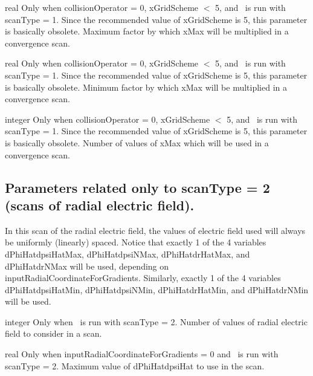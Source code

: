 \myhrule

{real}
{Only when {\ttfamily collisionOperator} = 0, {\ttfamily xGridScheme} $<$ 5, and \sfincsScan~is run with {\ttfamily scanType} = 1.
Since the recommended value of {\ttfamily xGridScheme} is 5, this parameter is basically obsolete.}
{Maximum factor by which {\ttfamily xMax} will be multiplied in a convergence scan.}

\myhrule

{real}
{Only when {\ttfamily collisionOperator} = 0, {\ttfamily xGridScheme} $<$ 5, and \sfincsScan~is run with {\ttfamily scanType} = 1.
Since the recommended value of {\ttfamily xGridScheme} is 5, this parameter is basically obsolete.}
{Minimum factor by which {\ttfamily xMax} will be multiplied in a convergence scan.}

\myhrule

{integer}
{Only when {\ttfamily collisionOperator} = 0, {\ttfamily xGridScheme} $<$ 5, and \sfincsScan~is run with {\ttfamily scanType} = 1.
Since the recommended value of {\ttfamily xGridScheme} is 5, this parameter is basically obsolete.}
{Number of values of {\ttfamily xMax} which will be used in a convergence scan.}




\subsection{Parameters related only to {\ttfamily scanType} = 2 (scans of radial electric field).}

In this scan of the radial electric field, the values of electric field used
will always be uniformly (linearly) spaced.  
Notice that exactly 1 of the 4 variables {\ttfamily dPhiHatdpsiHatMax}, {\ttfamily dPhiHatdpsiNMax}, {\ttfamily dPhiHatdrHatMax}, and {\ttfamily dPhiHatdrNMax}
will be used, depending on\\
{\ttfamily inputRadialCoordinateForGradients}.
Similarly, exactly 1 of the 4 variables
{\ttfamily dPhiHatdpsiHatMin}, {\ttfamily dPhiHatdpsiNMin}, {\ttfamily dPhiHatdrHatMin}, and {\ttfamily dPhiHatdrNMin}
will be used.

\myhrule

{integer}
{Only when \sfincsScan~is run with {\ttfamily scanType} = 2.}
{Number of values of radial electric field to consider in a scan.}

\myhrule

{real}
{Only when {\ttfamily inputRadialCoordinateForGradients} = 0 and \sfincsScan~is run with {\ttfamily scanType} = 2.}
{Maximum value of {\ttfamily dPhiHatdpsiHat} to use in the scan.}

